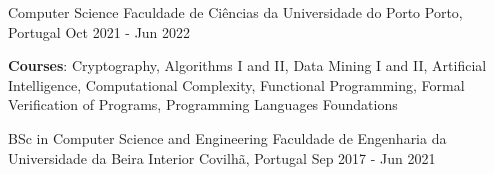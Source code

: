 


\begin{cventries}

\cventry
  {Computer Science} %
  {Faculdade de Ciências da Universidade do Porto} %
  {Porto, Portugal} %
  {Oct 2021 - Jun 2022} %
  {
    \begin{cvitems} %
    \item \textbf{Courses}:
      Cryptography,
      Algorithms I and II,
      Data Mining I and II,
      Artificial Intelligence,
      Computational Complexity,
      Functional Programming,
      Formal Verification of Programs,
      Programming Languages Foundations
    \end{cvitems}
  }
  {}

\cventry
  {BSc in Computer Science and Engineering} %
  {Faculdade de Engenharia da Universidade da Beira Interior} %
  {Covilhã, Portugal} %
  {Sep 2017 - Jun 2021} %
  {}
  {}

\end{cventries}
